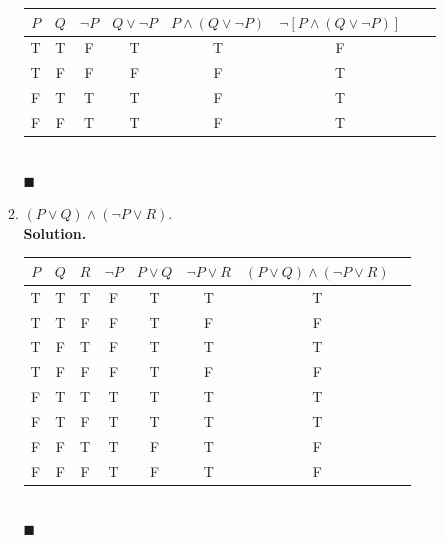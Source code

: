 \documentclass{report}
\newcommand{\sol}{\vspace{1em}\\\textbf{Solution.}\vspace{0.5em}}
\newcommand{\qed}{‎\\‎\hfill$\blacksquare$\vspace{1em}}
\begin{document}
\begin{enumerate}[leftmargin=*]
\begin{enumerate}
                    \begin{center}
                        \begin{tabular}{cccccccc}
                            $P$ & $Q$ & $\neg P$ & $Q \vee \neg P$ & $P \wedge(Q \vee \neg P)$ & $\neg[P \wedge(Q \vee \neg P)]$ \\
                            \hline
                            T   & T   & F        & T               & T                         & F                               \\
                            T   & F   & F        & F               & F                         & T                               \\
                            F   & T   & T        & T               & F                         & T                               \\
                            F   & F   & T        & T               & F                         & T
                        \end{tabular}
                    \end{center}\qed

              \item $(P \vee Q) \wedge(\neg P \vee R)$.
                    \sol{}
                    \begin{center}
                        \begin{tabular}{cccccccc}
                            $P$ & $Q$ & $R$ & $\neg P$ & $P \vee Q$ & $\neg P \vee R$ & $(P \vee Q) \wedge(\neg P \vee R)$ \\
                            \hline
                            T   & T   & T   & F        & T          & T               & T                                  \\
                            T   & T   & F   & F        & T          & F               & F                                  \\
                            T   & F   & T   & F        & T          & T               & T                                  \\
                            T   & F   & F   & F        & T          & F               & F                                  \\
                            F   & T   & T   & T        & T          & T               & T                                  \\
                            F   & T   & F   & T        & T          & T               & T                                  \\
                            F   & F   & T   & T        & F          & T               & F                                  \\
                            F   & F   & F   & T        & F          & T               & F
                        \end{tabular}
                    \end{center}\qed
          \end{enumerate}


\end{enumerate}
\end{document}
